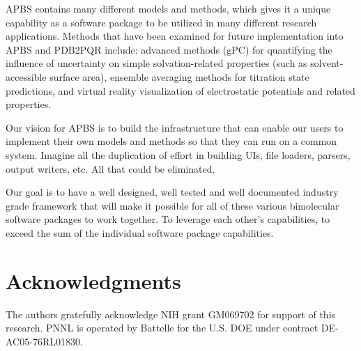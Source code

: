 \documentclass[11pt,titlepage]{article}
\begin{document}
APBS contains many different models and methods, which gives it a unique capability as a software package to be utilized in many different research applications. Methods that have been examined for future implementation into APBS and PDB2PQR include: advanced methods (gPC) for quantifying the influence of uncertainty on simple solvation-related properties (such as solvent-accessible surface area), ensemble averaging methods for titration state predictions, and virtual reality visualization of electrostatic potentials and related properties.

Our vision for APBS is to build the infrastructure that can enable our users to implement their own models and methods so that they can run on a common system. Imagine all the duplication of effort in building UIs, file loaders, parsers, output writers, etc. All that could be eliminated. 

Our goal is to have a well designed, well tested and well documented industry grade framework that will make it possible for all of these various bimolecular software packages to work together. To leverage each other's capabilities, to exceed the sum of the individual software package capabilities.

\section{Acknowledgments}
The authors gratefully acknowledge NIH grant GM069702 for support of this research. PNNL is operated by Battelle for the U.S. DOE under contract DE-AC05-76RL01830.  


\end{document}
